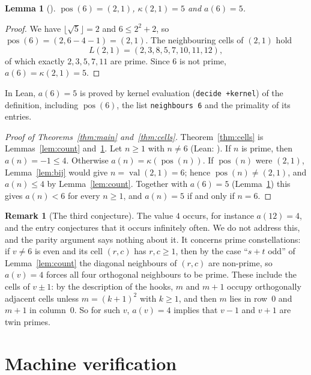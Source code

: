\documentclass[11pt]{amsart}
\theoremstyle{plain}
\newtheorem{lemma}[theorem]{Lemma}
\theoremstyle{definition}
\newtheorem{remark}[theorem]{Remark}
\newcommand{\val}{\operatorname{val}}
\newcommand{\pos}{\operatorname{pos}}
\begin{document}
\begin{lemma}[]\label{lem:six}
$\pos(6)=(2,1)$, $\kappa(2,1)=5$ and $a(6)=5$.
\end{lemma}

\begin{proof}
We have $\lfloor\sqrt5\rfloor=2$ and $6\le2^2+2$, so $\pos(6)=(2,6-4-1)=(2,1)$.
The neighbouring cells of $(2,1)$ hold
\[
  L(2,1)=(2,3,8,5,7,10,11,12),
\]
of which exactly $2,3,5,7,11$ are prime.
Since $6$ is not prime, $a(6)=\kappa(2,1)=5$.
\end{proof}

In Lean, $a(6)=5$ is proved by kernel evaluation (\texttt{decide +kernel}) of the definition, including $\pos(6)$, the list \texttt{neighbours 6} and the primality of its entries.

\begin{proof}[Proof of Theorems~\ref{thm:main} and~\ref{thm:cells}]
Theorem~\ref{thm:cells} is Lemmas~\ref{lem:count} and~\ref{lem:six}.
Let $n\ge1$ with $n\ne6$ (Lean: ).
If $n$ is prime, then $a(n)=-1\le4$.
Otherwise $a(n)=\kappa(\pos(n))$.
If $\pos(n)$ were $(2,1)$, Lemma~\ref{lem:bij} would give $n=\val(2,1)=6$; hence $\pos(n)\ne(2,1)$, and $a(n)\le4$ by Lemma~\ref{lem:count}.
Together with $a(6)=5$ (Lemma~\ref{lem:six}) this gives $a(n)<6$ for every $n\ge1$, and $a(n)=5$ if and only if $n=6$.
\end{proof}

\begin{remark}[The third conjecture]\label{rem:four}
The value $4$ occurs, for instance $a(12)=4$, and the entry conjectures that it occurs infinitely often.
We do not address this, and the parity argument says nothing about it.
It concerns prime constellations: if $v\ne6$ is even and its cell $(r,c)$ has $r,c\ge1$, then by the case ``$s+t$ odd'' of Lemma~\ref{lem:count} the diagonal neighbours of $(r,c)$ are non-prime, so $a(v)=4$ forces all four orthogonal neighbours to be prime.
These include the cells of $v\pm1$: by the description of the hooks, $m$ and $m+1$ occupy orthogonally adjacent cells unless $m=(k+1)^2$ with $k\ge1$, and then $m$ lies in row~$0$ and $m+1$ in column~$0$.
So for such $v$, $a(v)=4$ implies that $v-1$ and $v+1$ are twin primes.
\end{remark}

\section{Machine verification}\label{sec:lean}
\end{document}
